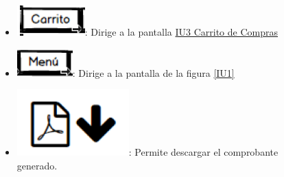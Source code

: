 \begin{figure}[h]
\begin{itemize}
		\item \includegraphics[scale=0.500]{imagenes/iconografia/Carrito.png}: Dirige a la pantalla \hyperlink{IU3}{IU3 Carrito de Compras}
		\item \includegraphics[scale=0.500]{imagenes/iconografia/Menu.png}: Dirige a la pantalla de la figura \ref{IU1}
		\item \includegraphics[scale=0.400]{imagenes/iconografia/Descarga.png}: Permite descargar el comprobante generado.
	\end{itemize}
	
\end{figure}

